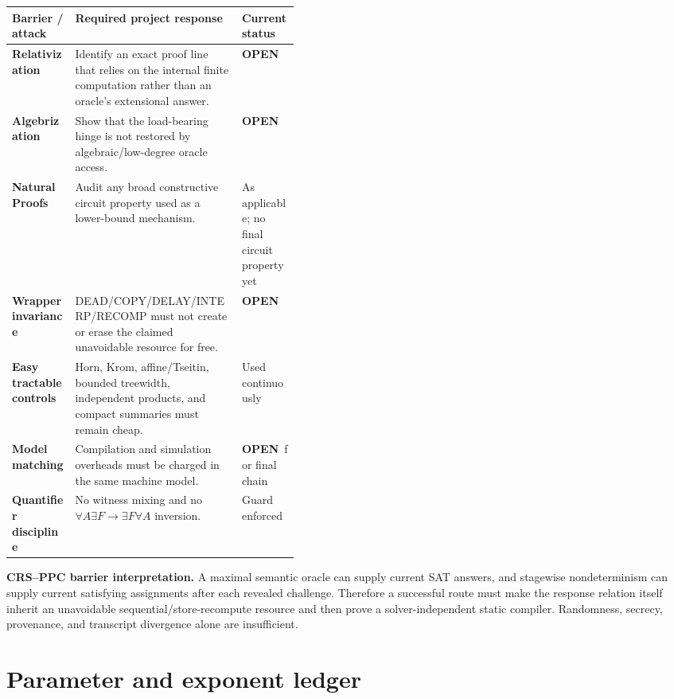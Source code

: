 \documentclass[11pt]{article}
\newcommand{\statusopen}{\textcolor{openstatus}{\textbf{OPEN}}}
\begin{document}
\begin{tabularx}{\linewidth}{>{\bfseries}p{0.22\linewidth} X >{\raggedright\arraybackslash}p{0.20\linewidth}}
\toprule
Barrier / attack & Required project response & Current status\\
\midrule
Relativization &
Identify an exact proof line that relies on the internal finite computation rather than an oracle's
extensional answer. &
\statusopen\\

Algebrization &
Show that the load-bearing hinge is not restored by algebraic/low-degree oracle access. &
\statusopen\\

Natural Proofs &
Audit any broad constructive circuit property used as a lower-bound mechanism. &
As applicable; no final circuit property yet\\

Wrapper invariance &
DEAD/COPY/DELAY/INTERP/RECOMP must not create or erase the claimed unavoidable resource for free. &
\statusopen\\

Easy tractable controls &
Horn, Krom, affine/Tseitin, bounded treewidth, independent products, and compact summaries must remain
cheap. &
Used continuously\\

Model matching &
Compilation and simulation overheads must be charged in the same machine model. &
\statusopen\ for final chain\\

Quantifier discipline &
No witness mixing and no \(\forall A\exists F\to\exists F\forall A\) inversion. &
Guard enforced\\
\bottomrule
\end{tabularx}

\begin{candidatebox}
\textbf{CRS--PPC barrier interpretation.}
A maximal semantic oracle can supply current SAT answers, and stagewise nondeterminism can supply
current satisfying assignments after each revealed challenge. Therefore a successful route must
make the response relation itself inherit an unavoidable sequential/store-recompute resource and
then prove a solver-independent static compiler. Randomness, secrecy, provenance, and transcript
divergence alone are insufficient.
\end{candidatebox}
\section{Parameter and exponent ledger}
\end{document}
